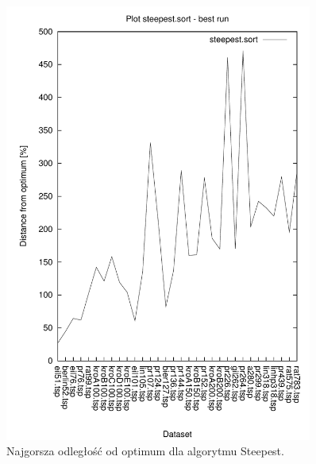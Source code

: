 \begin{figure}
\begin{center}
\includegraphics[width=0.9\textwidth]{wykresy/steepest_sort_worst}
\end{center}
\caption{Najgorsza odległość od optimum dla algorytmu Steepest.}
\label{steepest_sort_worst}
\end{figure}


